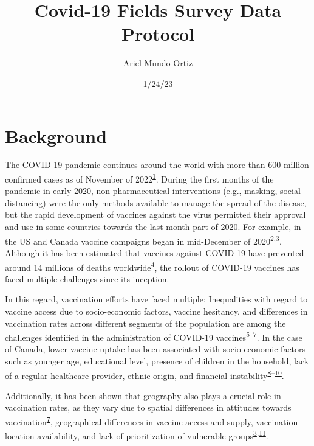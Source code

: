 \documentclass[
  letterpaper,
  DIV=11,
  numbers=noendperiod]{scrartcl}
\title{Covid-19 Fields Survey Data Protocol}
\author{Ariel Mundo Ortiz}
\date{1/24/23}
\begin{document}
\maketitle
\ifdefined\Shaded\renewenvironment{Shaded}{\begin{tcolorbox}[interior hidden, borderline west={3pt}{0pt}{shadecolor}, sharp corners, boxrule=0pt, enhanced, breakable, frame hidden]}{\end{tcolorbox}}\fi

\hypertarget{background}{%
\section{Background}\label{background}}

The COVID-19 pandemic continues around the world with more than 600
million confirmed cases as of November of
2022\textsuperscript{\protect\hyperlink{ref-WHO-Covid}{1}}. During the
first months of the pandemic in early 2020, non-pharmaceutical
interventions (e.g., masking, social distancing) were the only methods
available to manage the spread of the disease, but the rapid development
of vaccines against the virus permitted their approval and use in some
countries towards the last month part of 2020. For example, in the US
and Canada vaccine campaigns began in mid-December of
2020\textsuperscript{\protect\hyperlink{ref-tanne2020}{2},\protect\hyperlink{ref-bogoch2022}{3}}.
Although it has been estimated that vaccines against COVID-19 have
prevented around 14 millions of deaths
worldwide\textsuperscript{\protect\hyperlink{ref-watson2022}{4}}, the
rollout of COVID-19 vaccines has faced multiple challenges since its
inception.

In this regard, vaccination efforts have faced multiple: Inequalities
with regard to vaccine access due to socio-economic factors, vaccine
hesitancy, and differences in vaccination rates across different
segments of the population are among the challenges identified in the
administration of COVID-19
vaccines\textsuperscript{\protect\hyperlink{ref-gerretsen2021}{5}--\protect\hyperlink{ref-malik2020}{7}}.
In the case of Canada, lower vaccine uptake has been associated with
socio-economic factors such as younger age, educational level, presence
of children in the household, lack of a regular healthcare provider,
ethnic origin, and financial
instability\textsuperscript{\protect\hyperlink{ref-guay2022}{8}--\protect\hyperlink{ref-carter2022}{10}}.

Additionally, it has been shown that geography also plays a crucial role
in vaccination rates, as they vary due to spatial differences in
attitudes towards
vaccination\textsuperscript{\protect\hyperlink{ref-malik2020}{7}},
geographical differences in vaccine access and supply, vaccination
location availability, and lack of prioritization of vulnerable
groups\textsuperscript{\protect\hyperlink{ref-bogoch2022}{3},\protect\hyperlink{ref-nguyen2021}{11}}.
\end{document}

